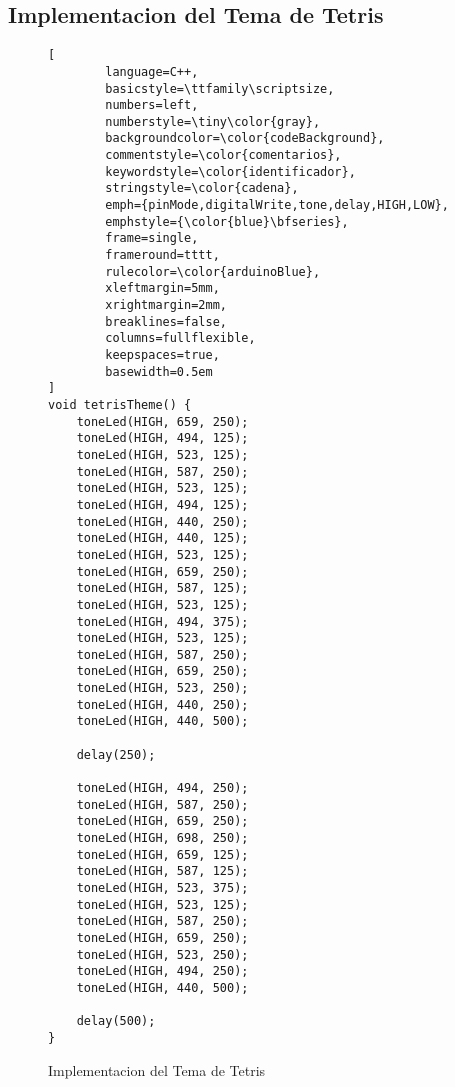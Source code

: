 \subsection{Implementacion del Tema de Tetris}
\begin{figure}[H]
	\centering
	\begin{lstlisting}[
		language=C++,
		basicstyle=\ttfamily\scriptsize,
		numbers=left,
		numberstyle=\tiny\color{gray},
		backgroundcolor=\color{codeBackground},
		commentstyle=\color{comentarios},
		keywordstyle=\color{identificador},
		stringstyle=\color{cadena},
		emph={pinMode,digitalWrite,tone,delay,HIGH,LOW},
		emphstyle={\color{blue}\bfseries},
		frame=single,
		frameround=tttt,
		rulecolor=\color{arduinoBlue},
		xleftmargin=5mm,
		xrightmargin=2mm,
		breaklines=false,
		columns=fullflexible,
		keepspaces=true,
		basewidth=0.5em 
]
void tetrisTheme() {
	toneLed(HIGH, 659, 250);  
	toneLed(HIGH, 494, 125);  
	toneLed(HIGH, 523, 125);  
	toneLed(HIGH, 587, 250);  
	toneLed(HIGH, 523, 125);  
	toneLed(HIGH, 494, 125);  
	toneLed(HIGH, 440, 250);  
	toneLed(HIGH, 440, 125);  
	toneLed(HIGH, 523, 125);  
	toneLed(HIGH, 659, 250);  
	toneLed(HIGH, 587, 125);  
	toneLed(HIGH, 523, 125);  
	toneLed(HIGH, 494, 375);  
	toneLed(HIGH, 523, 125);  
	toneLed(HIGH, 587, 250);  
	toneLed(HIGH, 659, 250);  
	toneLed(HIGH, 523, 250);  
	toneLed(HIGH, 440, 250);  
	toneLed(HIGH, 440, 500);  
	
	delay(250);  
	
	toneLed(HIGH, 494, 250);  
	toneLed(HIGH, 587, 250);  
	toneLed(HIGH, 659, 250);  
	toneLed(HIGH, 698, 250);  
	toneLed(HIGH, 659, 125);  
	toneLed(HIGH, 587, 125);  
	toneLed(HIGH, 523, 375);  
	toneLed(HIGH, 523, 125);  
	toneLed(HIGH, 587, 250);  
	toneLed(HIGH, 659, 250);  
	toneLed(HIGH, 523, 250);  
	toneLed(HIGH, 494, 250);  
	toneLed(HIGH, 440, 500);  
	
	delay(500);  
}
	\end{lstlisting}
	\caption{Implementacion del Tema de Tetris}
	\label{fig:tetris-theme}
\end{figure}

